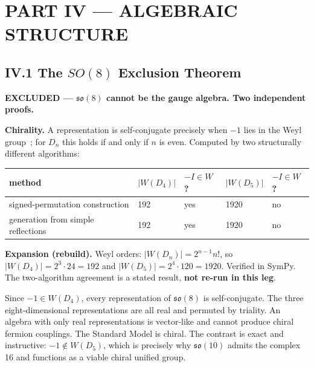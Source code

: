 \documentclass[11pt,a4paper]{article}
\newcommand{\expansion}[1]{\par\smallskip\noindent\textbf{Expansion (rebuild).} #1\par\smallskip}
\begin{document}
\section{PART IV --- ALGEBRAIC STRUCTURE}

\subsection{IV.1 The $SO(8)$ Exclusion Theorem}
\textbf{EXCLUDED --- $\mathfrak{so}(8)$ cannot be the gauge algebra. Two independent proofs.}

\textbf{Chirality.} A representation is self-conjugate precisely when $-1$ lies in the Weyl group~\cite{humphreys1972}; for $D_n$ this holds if and only if $n$ is even. Computed by two structurally different algorithms:
\begin{center}
\begin{tabular}{lllll}
\toprule
method & $|W(D_4)|$ & $-I \in W$? & $|W(D_5)|$ & $-I \in W$? \\
\midrule
signed-permutation construction & 192 & yes & 1920 & no \\
generation from simple reflections & 192 & yes & 1920 & no \\
\bottomrule
\end{tabular}
\end{center}
\expansion{Weyl orders: $|W(D_n)| = 2^{n-1}n!$, so $|W(D_4)| = 2^3\cdot 24 = 192$ and $|W(D_5)| = 2^4\cdot 120 = 1920$. Verified in SymPy. The two-algorithm agreement is a stated result, \textbf{not re-run in this leg}.}
Since $-1 \in W(D_4)$, every representation of $\mathfrak{so}(8)$ is self-conjugate. The three eight-dimensional representations are all real and permuted by triality. An algebra with only real representations is vector-like and cannot produce chiral fermion couplings. The Standard Model is chiral. The contrast is exact and instructive: $-1 \notin W(D_5)$, which is precisely why $\mathfrak{so}(10)$ admits the complex 16 and functions as a viable chiral unified group.
\end{document}
